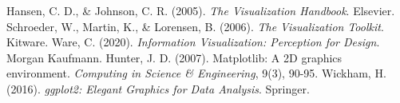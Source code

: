 \documentclass[11pt]{article}
\begin{document}
	\begin{thebibliography}{9}
		 Hansen, C. D., \& Johnson, C. R. (2005). \textit{The Visualization Handbook}. Elsevier.
		 Schroeder, W., Martin, K., \& Lorensen, B. (2006). \textit{The Visualization Toolkit}. Kitware.
		 Ware, C. (2020). \textit{Information Visualization: Perception for Design}. Morgan Kaufmann.
		 Hunter, J. D. (2007). Matplotlib: A 2D graphics environment. \textit{Computing in Science \& Engineering}, 9(3), 90-95.
		 Wickham, H. (2016). \textit{ggplot2: Elegant Graphics for Data Analysis}. Springer.
	\end{thebibliography}
	
\end{document}
